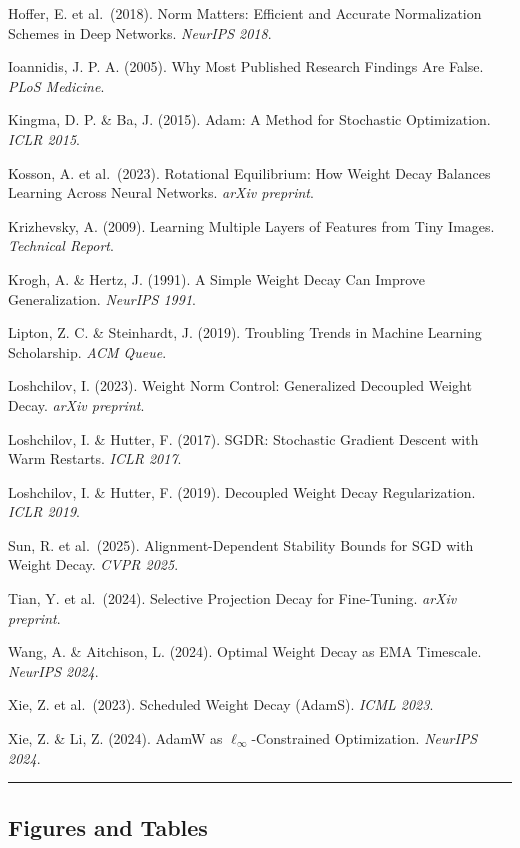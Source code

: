 \documentclass[
]{article}
\begin{document}
Hoffer, E. et al.~(2018). Norm Matters: Efficient and Accurate
Normalization Schemes in Deep Networks. \emph{NeurIPS 2018}.

Ioannidis, J. P. A. (2005). Why Most Published Research Findings Are
False. \emph{PLoS Medicine}.

Kingma, D. P. \& Ba, J. (2015). Adam: A Method for Stochastic
Optimization. \emph{ICLR 2015}.

Kosson, A. et al.~(2023). Rotational Equilibrium: How Weight Decay
Balances Learning Across Neural Networks. \emph{arXiv preprint}.

Krizhevsky, A. (2009). Learning Multiple Layers of Features from Tiny
Images. \emph{Technical Report}.

Krogh, A. \& Hertz, J. (1991). A Simple Weight Decay Can Improve
Generalization. \emph{NeurIPS 1991}.

Lipton, Z. C. \& Steinhardt, J. (2019). Troubling Trends in Machine
Learning Scholarship. \emph{ACM Queue}.

Loshchilov, I. (2023). Weight Norm Control: Generalized Decoupled Weight
Decay. \emph{arXiv preprint}.

Loshchilov, I. \& Hutter, F. (2017). SGDR: Stochastic Gradient Descent
with Warm Restarts. \emph{ICLR 2017}.

Loshchilov, I. \& Hutter, F. (2019). Decoupled Weight Decay
Regularization. \emph{ICLR 2019}.

Sun, R. et al.~(2025). Alignment-Dependent Stability Bounds for SGD with
Weight Decay. \emph{CVPR 2025}.

Tian, Y. et al.~(2024). Selective Projection Decay for Fine-Tuning.
\emph{arXiv preprint}.

Wang, A. \& Aitchison, L. (2024). Optimal Weight Decay as EMA Timescale.
\emph{NeurIPS 2024}.

Xie, Z. et al.~(2023). Scheduled Weight Decay (AdamS). \emph{ICML 2023}.

Xie, Z. \& Li, Z. (2024). AdamW as \(\ell_\infty\)-Constrained
Optimization. \emph{NeurIPS 2024}.

\begin{center}\rule{0.5\linewidth}{0.5pt}\end{center}

\hypertarget{figures-and-tables}{%
\subsection{Figures and Tables}\label{figures-and-tables}}
\end{document}
